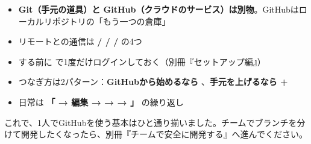 \begin{itemize}[leftmargin=1.4em]
  \item \textbf{Git（手元の道具）と GitHub（クラウドのサービス）は別物}。GitHubはローカルリポジトリの「もう一つの倉庫」
  \item リモートとの通信は \textbf{ /  /  / } の4つ
  \item {} する前に \textbf{} で1度だけログインしておく（別冊『セットアップ編』）
  \item つなぎ方は2パターン：\textbf{GitHubから始めるなら }、\textbf{手元を上げるなら  + }
  \item 日常は \textbf{「 → 編集 →  →  → 」} の繰り返し
\end{itemize}

これで、1人でGitHubを使う基本はひと通り揃いました。チームでブランチを分けて開発したくなったら、別冊『チームで安全に開発する』へ進んでください。
